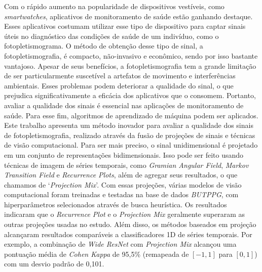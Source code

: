 Com o rápido aumento na popularidade de dispositivos vestíveis, como \textit{smartwatches}, aplicativos de monitoramento de saúde estão ganhando destaque. Esses aplicativos costumam utilizar esse tipo de dispositivo para captar sinais úteis no diagnóstico das condições de saúde de um indivíduo, como o fotopletismograma. O método de obtenção desse tipo de sinal, a fotopletismografia, é compacto, não-invasivo e econômico, sendo por isso bastante vantajoso. Apesar de seus benefícios, a fotopletismografia tem a grande limitação de ser particularmente suscetível a artefatos de movimento e interferências ambientais. Esses problemas podem deteriorar a qualidade do sinal, o que prejudica significativamente a eficácia dos aplicativos que o consomem. Portanto, avaliar a qualidade dos sinais é essencial nas aplicações de monitoramento de saúde.
Para esse fim, algoritmos de aprendizado de máquina podem ser aplicados. Este trabalho apresenta um método inovador para avaliar a qualidade dos sinais de fotopletismografia, realizado através da fusão de projeções de sinais e técnicas de visão computacional. Para ser mais preciso, o sinal unidimensional é projetado em um conjunto de representações bidimensionais. Isso pode ser feito usando técnicas de imagem de séries temporais, como \textit{Gramian Angular Field}, \textit{Markov Transition Field} e \textit{Recurrence Plots}, além de agregar seus resultados, o que chamamos de `\textit{Projection Mix}'. Com essas projeções, várias modelos de visão computacional foram treinadas e testadas na base de dados \textit{\acrshort{BUTPPG}}, com hiperparâmetros selecionados através de busca heurística. Os resultados indicaram que o \textit{Recurrence Plot} e o \textit{Projection Mix} geralmente superaram as outras projeções usadas no estudo. Além disso, os métodos baseados em projeção alcançaram resultados comparáveis a classificadores 1D de séries temporais. Por exemplo, a combinação de \textit{Wide ResNet} com \textit{Projection Mix} alcançou uma pontuação média de \textit{Cohen Kappa} de 95,5\% (remapeada de $[-1,1]$ para $[0,1]$) com um desvio padrão de 0,101. 
